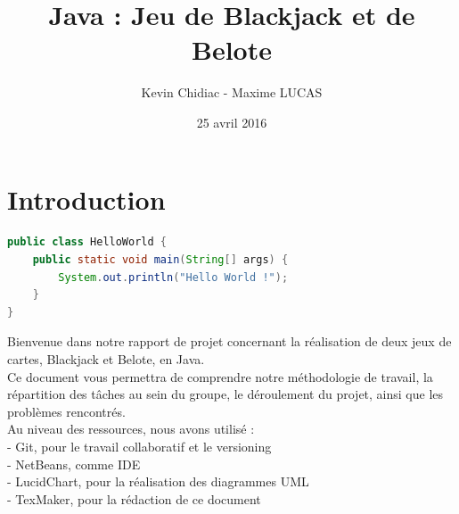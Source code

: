 \documentclass[a4paper]{report}
\begin{document}
\author{Kevin Chidiac - Maxime LUCAS}
\date{25 avril 2016}
\title{Java : Jeu de Blackjack et de Belote }
\maketitle

\tableofcontents

\newpage
\section{Introduction}
\begin{lstlisting}[language={java}]
public class HelloWorld {
	public static void main(String[] args) {
		System.out.println("Hello World !");	
	}
}
\end{lstlisting}
Bienvenue dans notre rapport de projet concernant la réalisation de deux jeux de cartes, Blackjack et Belote, en Java.\\
Ce document vous permettra de comprendre notre méthodologie de travail, la répartition des tâches au sein du groupe, le déroulement du projet, ainsi que les problèmes rencontrés.\\
Au niveau des ressources, nous avons utilisé : \\
- Git, pour le travail collaboratif et le versioning \\
- NetBeans, comme IDE \\
- LucidChart, pour la réalisation des diagrammes UML\\
- TexMaker, pour la rédaction de ce document
\end{document}
